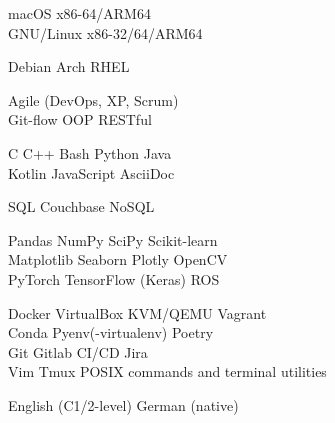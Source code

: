 \documentclass[a4paper]{./src/resume-cv}
\begin{document}
\begin{minipage}[t]{0.42\textwidth}
	\faApple\space\space macOS x86-64/ARM64\\
	\faLinux\space GNU/Linux x86-32/64/ARM64
	\subsectionsep

	Debian \bulletsep Arch \bulletsep RHEL
	\subsectionsep
	
	Agile (DevOps, XP, Scrum)\\
	Git-flow \bulletsep OOP \bulletsep RESTful
	\subsectionsep

	C \bulletsep C++ \bulletsep Bash \bulletsep Python \bulletsep Java \\
	Kotlin \bulletsep JavaScript \bulletsep AsciiDoc \bulletsep \latex
	\subsectionsep
	
	SQL \bulletsep Couchbase NoSQL
	\subsectionsep

	Pandas \bulletsep NumPy \bulletsep SciPy \bulletsep Scikit-learn\\
	Matplotlib \bulletsep Seaborn \bulletsep Plotly \bulletsep OpenCV\\
	PyTorch \bulletsep TensorFlow (Keras) \bulletsep ROS
	\subsectionsep

	Docker \bulletsep VirtualBox \bulletsep KVM/QEMU \bulletsep Vagrant\\
	Conda \bulletsep Pyenv(-virtualenv) \bulletsep Poetry\\
	Git \bulletsep Gitlab CI/CD \bulletsep Jira \\
	Vim \bulletsep Tmux \bulletsep POSIX commands and terminal utilities\\
	
	\subsectionsep
	
	English (C1/2-level) \bulletsep German (native)

\end{minipage}\quad %
\hfill %
\end{document}
